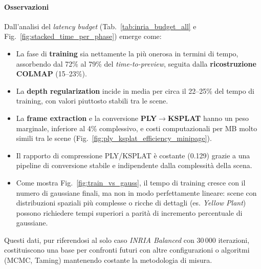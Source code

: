 \paragraph{Osservazioni}
Dall’analisi del \emph{latency budget} (Tab.~\ref{tab:inria_budget_all} e Fig.~\ref{fig:stacked_time_per_phase}) emerge come:
\begin{itemize}
	\item La fase di \textbf{training} sia nettamente la più onerosa in termini di tempo, assorbendo dal 72\% al 79\% del \emph{time-to-preview}, seguita dalla \textbf{ricostruzione COLMAP} (15–23\%).
	\item La \textbf{depth regularization} incide in media per circa il 22–25\% del tempo di training, con valori piuttosto stabili tra le scene.
	\item La \textbf{frame extraction} e la conversione \textbf{PLY$\rightarrow$KSPLAT} hanno un peso marginale, inferiore al 4\% complessivo, e costi computazionali per MB molto simili tra le scene (Fig.~\ref{fig:ply_ksplat_efficiency_minipage}).
	\item Il rapporto di compressione PLY/KSPLAT è costante (0.129) grazie a una pipeline di conversione stabile e indipendente dalla complessità della scena.
	\item Come mostra Fig.~\ref{fig:train_vs_gauss}, il tempo di training cresce con il numero di gaussiane finali, ma non in modo perfettamente lineare: scene con distribuzioni spaziali più complesse o ricche di dettagli (es. \emph{Yellow Plant}) possono richiedere tempi superiori a parità di incremento percentuale di gaussiane.
\end{itemize}

Questi dati, pur riferendosi al solo caso \emph{INRIA Balanced} con 30\,000 iterazioni, costituiscono una base per confronti futuri con altre configurazioni o algoritmi (MCMC, Taming) mantenendo costante la metodologia di misura.
